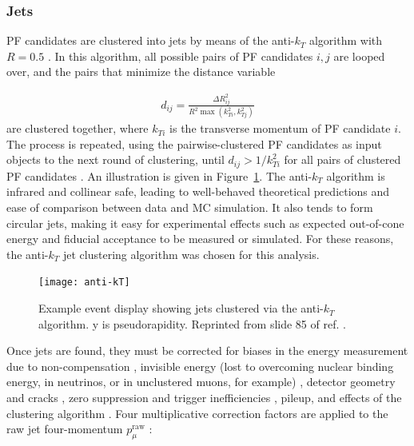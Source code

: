 \documentclass[dissertation.tex]{subfiles}
\begin{document}
\subsubsection{Jets}
\label{sec:Jets}

PF candidates are clustered into jets by means of the anti-$k_{T}$ algorithm with $R = 0.5$ \cite{1126-6708-2008-04-063}.  In this algorithm, all possible pairs of PF candidates $i, j$ are looped over, and the pairs that minimize the distance variable

\begin{eqnarray}
d_{ij} = \frac{\Delta R_{ij}^{2}}{R^{2}\max(k_{Ti}^{2}, k_{Tj}^{2})}
\end{eqnarray}
%
are clustered together, where $k_{Ti}$ is the transverse momentum of PF candidate $i$.  The process is repeated, using the pairwise-clustered PF candidates as input objects to the next round of clustering, until $d_{ij} > 1/k_{Ti}^{2}$ for all pairs of clustered PF candidates \cite{Salam_talk}.  An illustration is given in Figure~\ref{fig:anti-kT}.  The anti-$k_{T}$ algorithm is infrared and collinear safe, leading to well-behaved theoretical predictions and ease of comparison between data and MC simulation.  It also tends to form circular jets, making it easy for experimental effects such as expected out-of-cone energy and fiducial acceptance to be measured or simulated.  For these reasons, the anti-$k_{T}$ jet clustering algorithm was chosen for this analysis.

\begin{figure}
	\centering
	\texttt{[image: anti-kT]}
	\caption{Example event display showing jets clustered via the anti-$k_{T}$ algorithm.  y is pseudorapidity.  Reprinted from slide 85 of ref. \cite{Salam_talk}.}
	\label{fig:anti-kT}
\end{figure}

Once jets are found, they must be corrected for biases in the energy measurement due to non-compensation \cite{0034-4885-52-12-002}, invisible energy (lost to overcoming nuclear binding energy, in neutrinos, or in unclustered muons, for example) \cite{0034-4885-52-12-002}, detector geometry and cracks \cite{CDF_JEC_website}, zero suppression and trigger inefficiencies \cite{1748-0221-6-09-P09001}, pileup, and effects of the clustering algorithm \cite{CDF_JEC_website}.  Four multiplicative correction factors are applied to the raw jet four-momentum $p_{\mu}^{\mathrm{raw}}$ \cite{1748-0221-6-11-P11002}:
\end{document}
